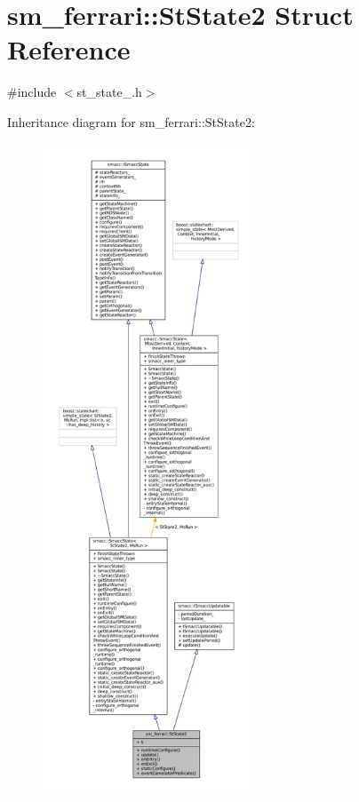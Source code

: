 \hypertarget{structsm__ferrari_1_1StState2}{}\section{sm\+\_\+ferrari\+:\+:St\+State2 Struct Reference}
\label{structsm__ferrari_1_1StState2}


{\ttfamily \#include $<$st\+\_\+state\+\_.\+h$>$}



Inheritance diagram for sm\+\_\+ferrari\+:\+:St\+State2\+:
\nopagebreak
\begin{figure}[H]
\begin{center}
\leavevmode
\includegraphics[height=550pt]{structsm__ferrari_1_1StState2__inherit__graph}
\end{center}
\end{figure}


